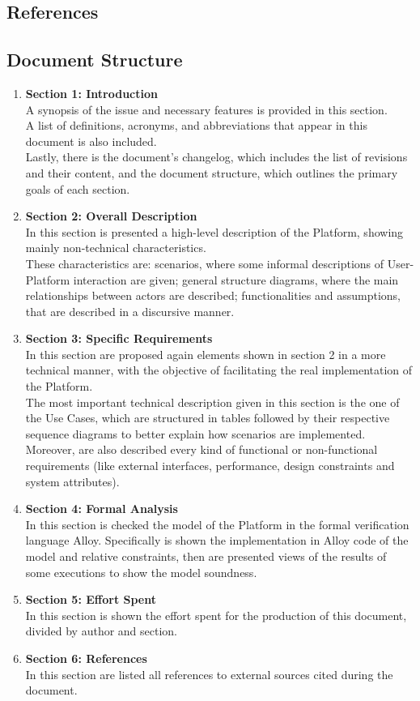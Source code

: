 \subsection{References}

\subsection{Document Structure}
\begin{enumerate}[label=$\bullet$]
    \item \textbf{Section 1: Introduction}\\
    A synopsis of the issue and necessary features is provided in this section.\\
    A list of definitions, acronyms, and abbreviations that appear in this document is also included.\\
    Lastly, there is the document's changelog, which includes the list of revisions and their content, and the document structure, which outlines the primary goals of each section.
    \item \textbf{Section 2: Overall Description}\\
    In this section is presented a high-level description of the Platform, showing mainly non-technical characteristics.\\
    These characteristics are: 
    scenarios, where some informal descriptions of User-Platform interaction are given; 
    general structure diagrams, where the main relationships between actors are described; 
    functionalities and assumptions, that are described in a discursive manner.
    \item \textbf{Section 3: Specific Requirements}\\
    In this section are proposed again elements shown in section 2 in a more technical manner, with the objective of facilitating the real implementation of the Platform.\\
    The most important technical description given in this section is the one of the Use Cases, which are structured in tables followed by their respective sequence diagrams to better explain how scenarios are implemented.\\
    Moreover, are also described every kind of functional or non-functional requirements (like external interfaces, performance, design constraints and system attributes).
    \item \textbf{Section 4: Formal Analysis}\\
    In this section is checked the model of the Platform in the formal verification language Alloy.
    Specifically is shown the implementation in Alloy code of the model and relative constraints, then are presented views of the results of some executions to show the model soundness.
    \item \textbf{Section 5: Effort Spent}\\
    In this section is shown the effort spent for the production of this document, divided by author and section.
    \item \textbf{Section 6: References}\\
    In this section are listed all references to external sources cited during the document.
\end{enumerate}